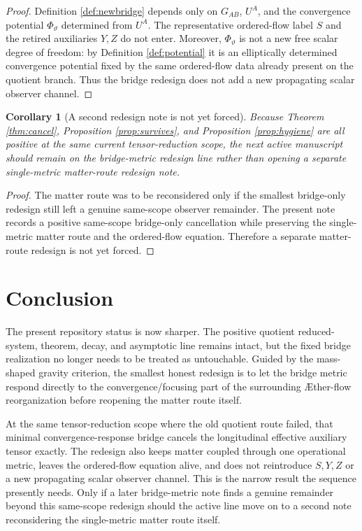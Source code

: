 \documentclass[11pt]{article}
\newcommand{\Aflow}{\AE{}ther-flow}
\newtheorem{corollary}{Corollary}
\begin{document}
\begin{proof}
Definition \ref{def:newbridge} depends only on \(G_{AB}\), \(U^A\), and the convergence potential \(\Phi_\vartheta\) determined from \(U^A\). The representative ordered-flow label \(S\) and the retired auxiliaries \(Y,Z\) do not enter. Moreover, \(\Phi_\vartheta\) is not a new free scalar degree of freedom: by Definition \ref{def:potential} it is an elliptically determined convergence potential fixed by the same ordered-flow data already present on the quotient branch. Thus the bridge redesign does not add a new propagating scalar observer channel.
\end{proof}

\begin{corollary}[A second redesign note is not yet forced]
\label{cor:nomatter}
Because Theorem \ref{thm:cancel}, Proposition \ref{prop:survives}, and Proposition \ref{prop:hygiene} are all positive at the same current tensor-reduction scope, the next active manuscript should remain on the bridge-metric redesign line rather than opening a separate single-metric matter-route redesign note.
\end{corollary}

\begin{proof}
The matter route was to be reconsidered only if the smallest bridge-only redesign still left a genuine same-scope observer remainder. The present note records a positive same-scope bridge-only cancellation while preserving the single-metric matter route and the ordered-flow equation. Therefore a separate matter-route redesign is not yet forced.
\end{proof}

\section{Conclusion}

The present repository status is now sharper. The positive quotient reduced-system, theorem, decay, and asymptotic line remains intact, but the fixed bridge realization no longer needs to be treated as untouchable. Guided by the mass-shaped gravity criterion, the smallest honest redesign is to let the bridge metric respond directly to the convergence/focusing part of the surrounding \Aflow{} reorganization before reopening the matter route itself.

At the same tensor-reduction scope where the old quotient route failed, that minimal convergence-response bridge cancels the longitudinal effective auxiliary tensor exactly. The redesign also keeps matter coupled through one operational metric, leaves the ordered-flow equation alive, and does not reintroduce \(S,Y,Z\) or a new propagating scalar observer channel. This is the narrow result the sequence presently needs. Only if a later bridge-metric note finds a genuine remainder beyond this same-scope redesign should the active line move on to a second note reconsidering the single-metric matter route itself.
\end{document}
